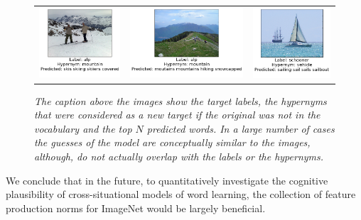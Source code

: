 \begin{figure}
\begin{tabular}{ccc}
\includegraphics[scale=0.23]{chapters/TAL/imagenet/ski} & \includegraphics[scale=0.23]{chapters/TAL/imagenet/mountain} & \includegraphics[scale=0.23]{chapters/TAL/imagenet/sail}
\end{tabular}
\caption{\textit{The caption above the images show the target labels, the
  hypernyms that were considered as a new target if the original was
  not in the vocabulary and the top $N$ predicted words. In a large
  number of cases the guesses of the model are conceptually similar to
  the images, although, do not actually overlap with the labels or the
  hypernyms.}}
\label{fig:pretty}
\end{figure}

We conclude that in the future, to quantitatively investigate the cognitive plausibility of cross-situational
models of word learning, the collection of feature production norms for ImageNet \cite{ILSVRCarxiv14} would
be largely beneficial.
